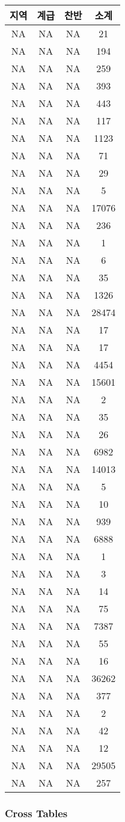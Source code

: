 \documentclass[
]{article}
\begin{document}
\begin{longtable}[]{@{}cccc@{}}
\toprule
지역 & 계급 & 찬반 & 소계\tabularnewline
\midrule
\endhead
NA & NA & NA & 21\tabularnewline
NA & NA & NA & 194\tabularnewline
NA & NA & NA & 259\tabularnewline
NA & NA & NA & 393\tabularnewline
NA & NA & NA & 443\tabularnewline
NA & NA & NA & 117\tabularnewline
NA & NA & NA & 1123\tabularnewline
NA & NA & NA & 71\tabularnewline
NA & NA & NA & 29\tabularnewline
NA & NA & NA & 5\tabularnewline
NA & NA & NA & 17076\tabularnewline
NA & NA & NA & 236\tabularnewline
NA & NA & NA & 1\tabularnewline
NA & NA & NA & 6\tabularnewline
NA & NA & NA & 35\tabularnewline
NA & NA & NA & 1326\tabularnewline
NA & NA & NA & 28474\tabularnewline
NA & NA & NA & 17\tabularnewline
NA & NA & NA & 17\tabularnewline
NA & NA & NA & 4454\tabularnewline
NA & NA & NA & 15601\tabularnewline
NA & NA & NA & 2\tabularnewline
NA & NA & NA & 35\tabularnewline
NA & NA & NA & 26\tabularnewline
NA & NA & NA & 6982\tabularnewline
NA & NA & NA & 14013\tabularnewline
NA & NA & NA & 5\tabularnewline
NA & NA & NA & 10\tabularnewline
NA & NA & NA & 939\tabularnewline
NA & NA & NA & 6888\tabularnewline
NA & NA & NA & 1\tabularnewline
NA & NA & NA & 3\tabularnewline
NA & NA & NA & 14\tabularnewline
NA & NA & NA & 75\tabularnewline
NA & NA & NA & 7387\tabularnewline
NA & NA & NA & 55\tabularnewline
NA & NA & NA & 16\tabularnewline
NA & NA & NA & 36262\tabularnewline
NA & NA & NA & 377\tabularnewline
NA & NA & NA & 2\tabularnewline
NA & NA & NA & 42\tabularnewline
NA & NA & NA & 12\tabularnewline
NA & NA & NA & 29505\tabularnewline
NA & NA & NA & 257\tabularnewline
\bottomrule
\end{longtable}

\hypertarget{cross-tables}{%
\subsubsection{Cross Tables}\label{cross-tables}}
\end{document}

